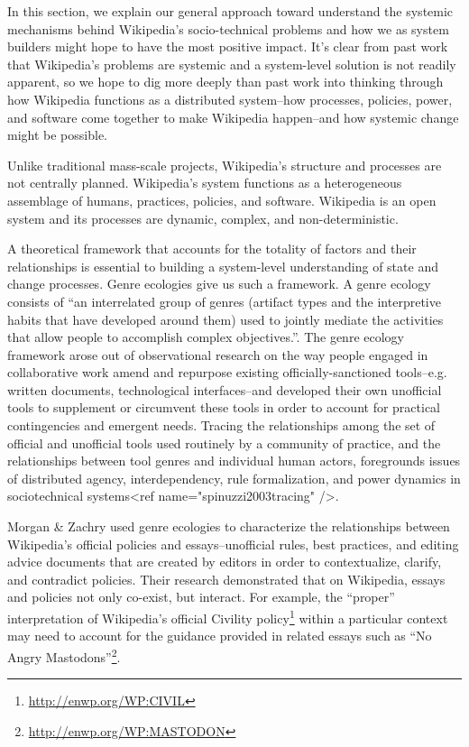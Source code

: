 In this section, we explain our general approach toward understand the systemic mechanisms behind Wikipedia's socio-technical problems and how we as system builders might hope to have the most positive impact.  It's clear from past work that Wikipedia's problems are systemic and a system-level solution is not readily apparent, so we hope to dig more deeply than past work into thinking through how Wikipedia functions as a distributed system--how processes, policies, power, and software come together to make Wikipedia happen--and how systemic change might be possible.

  Unlike traditional mass-scale projects, Wikipedia's structure and processes are not centrally planned.  Wikipedia's system functions as a heterogeneous assemblage of humans, practices, policies, and software.  Wikipedia is an open system and its processes are dynamic, complex, and non-deterministic.

A theoretical framework that accounts for the totality of factors and their relationships is essential to building a system-level understanding of state and change processes.  Genre ecologies give us such a framework. A genre ecology consists of ``an interrelated group of genres (artifact types and the interpretive habits that have developed around them) used to jointly mediate the activities that allow people to accomplish complex objectives.''\cite{spinuzzi2000genre}. The genre ecology framework arose out of observational research on the way people engaged in collaborative work amend and repurpose existing officially-sanctioned tools--e.g. written documents, technological interfaces--and developed their own unofficial tools to supplement or circumvent these tools in order to account for practical contingencies and emergent needs. Tracing the relationships among the set of official and unofficial tools used routinely by a community of practice, and the relationships between tool genres and individual human actors, foregrounds issues of distributed agency, interdependency, rule formalization, and power dynamics in sociotechnical systems<ref name="spinuzzi2003tracing" />.

Morgan \& Zachry used genre ecologies to characterize the relationships between Wikipedia's official policies and essays--unofficial rules, best practices, and editing advice documents that are created by editors in order to contextualize, clarify, and contradict policies\cite{morgan2010negotiating}. Their research demonstrated that on Wikipedia, essays and policies not only co-exist, but interact. For example, the ``proper'' interpretation of Wikipedia's official Civility policy\footnote{\url{http://enwp.org/WP:CIVIL}} within a particular context may need to account for the guidance provided in related essays such as ``No Angry Mastodons''\footnote{\url{http://enwp.org/WP:MASTODON}}.


